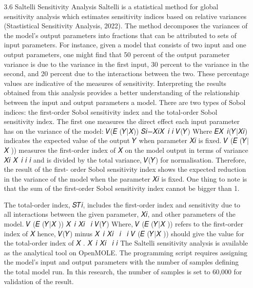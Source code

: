 \documentclass[smallextended]{svjour3}       %
\begin{document}
3.6 Saltelli Sensitivity Analysis
Saltelli is a statistical method for global sensitivity analysis which estimates sensitivity indices based on relative variances (Stastistical Sensitivity Analysis, 2022). The method decomposes the variances of the model’s output parameters into fractions that can be attributed to sets of input parameters. For instance, given a model that consists of two input and one output parameters, one might find that 50 percent of the output parameter variance is due to the variance in the first input, 30 percent to the variance in the second, and 20 percent due to the interactions between the two. These percentage values are indicative of the measures of sensitivity. Interpreting the results obtained from this analysis provides a better understanding of the relationship between the input and output parameters a model.
There are two types of Sobol indices: the first-order Sobol sensitivity index and the total-order Sobol sensitivity index. The first one measures the direct effect each input parameter has on the variance of the model:
𝑉(𝐸 (𝑌|𝑋)) 𝑆𝑖=𝑋𝑖𝑋~𝑖 𝑖
𝑉(𝑌)
 Where 𝐸𝑋~𝑖(𝑌|𝑋𝑖) indicates the expected value of the output 𝑌 when parameter 𝑋𝑖 is fixed. 𝑉 (𝐸 (𝑌|𝑋 )) measures the first-order index of 𝑋 on the model output in terms of variance
𝑋𝑖 𝑋~𝑖 𝑖 𝑖
and is divided by the total variance, 𝑉(𝑌) for normalisation. Therefore, the result of the first-
order Sobol sensitivity index shows the expected reduction in the variance of the model when the parameter 𝑋𝑖 is fixed. One thing to note is that the sum of the first-order Sobol sensitivity index cannot be bigger than 1.

The total-order index, 𝑆𝑇𝑖, includes the first-order index and sensitivity due to all interactions between the given parameter, 𝑋𝑖, and other parameters of the model.
𝑉 (𝐸 (𝑌|𝑋 )) 𝑋~𝑖 𝑋𝑖 ~𝑖
𝑉(𝑌)
Where, 𝑉 (𝐸 (𝑌|𝑋 )) refers to the first-order index of 𝑋 hence, 𝑉(𝑌) minus 𝑋~𝑖 𝑋𝑖 ~𝑖 ~𝑖
𝑉 (𝐸 (𝑌|𝑋 )) should give the value for the total-order index of 𝑋 . 𝑋~𝑖 𝑋𝑖 ~𝑖 𝑖
The Saltelli sensitivity analysis is available as the analytical tool on OpenMOLE. The programming script requires assigning the model’s input and output parameters with the number of samples defining the total model run. In this research, the number of samples is set to 60,000 for validation of the result.
\end{document}
